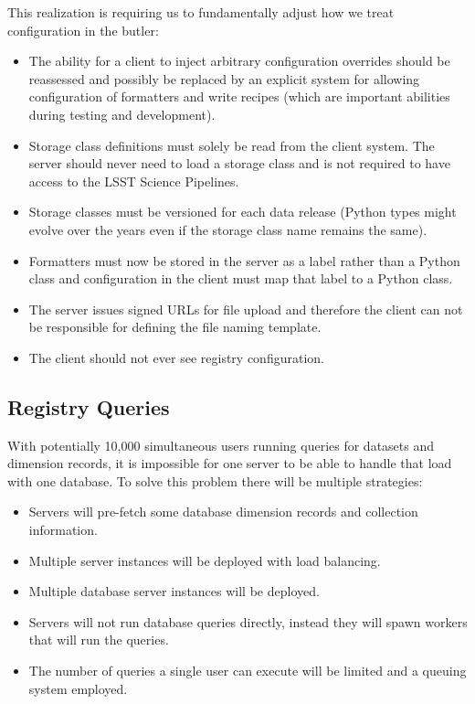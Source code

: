 This realization is requiring us to fundamentally adjust how we treat configuration in the butler:

\begin{itemize}
\item The ability for a client to inject arbitrary configuration overrides should be reassessed and possibly be replaced by an explicit system for allowing configuration of formatters and write recipes (which are important abilities during testing and development).
\item Storage class definitions must solely be read from the client system.
  The server should never need to load a storage class and is not required to have access to the LSST Science Pipelines.
\item Storage classes must be versioned for each data release (Python types might evolve over the years even if the storage class name remains the same).
\item Formatters must now be stored in the server as a label rather than a Python class and configuration in the client must map that label to a Python class.
\item The server issues signed URLs for file upload and therefore the client can not be responsible for defining the file naming template.
\item The client should not ever see registry configuration.
\end{itemize}


\subsection{Registry Queries}

With potentially 10,000 simultaneous users running queries for datasets and dimension records, it is impossible for one server to be able to handle that load with one database.
To solve this problem there will be multiple strategies:

\begin{itemize}
\item
  Servers will pre-fetch some database dimension records and collection information. \cite{DMTN-289}
\item
  Multiple server instances will be deployed with load balancing.
\item
  Multiple database server instances will be deployed.
\item
  Servers will not run database queries directly, instead they will spawn workers that will run the queries.
\item
  The number of queries a single user can execute will be limited and a queuing system employed.
\end{itemize}


